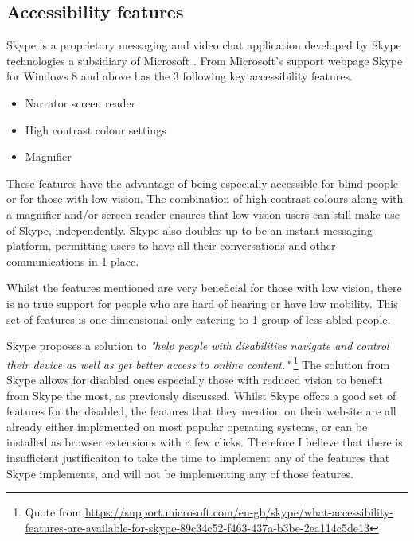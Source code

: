 \subsection*{Accessibility features}

Skype is a proprietary messaging and video chat application
developed by Skype technologies a subsidiary of Microsoft 
\cite{skype}. From Microsoft's support webpage Skype for 
Windows 8 and above has the 3 following key accessibility 
features.

\begin{itemize}
  \item Narrator screen reader
  \item High contrast colour settings
  \item Magnifier
\end{itemize}

These features have the advantage of being especially 
accessible for blind people or for those with low vision. The 
combination of high contrast colours along with a magnifier 
and/or screen reader ensures that low vision users can still 
make use of Skype, independently. Skype also doubles up to be
an instant messaging platform, permitting users to have all 
their conversations and other communications in 1 place.

\vspace{0.2cm}

Whilst the features mentioned are very beneficial for those 
with low vision, there is no true support for people who are
hard of hearing or have low mobility. This set of features is 
one-dimensional only catering to 1 group of less abled people.

\vspace{0.2cm}

Skype proposes a solution to \textit{"help people with 
disabilities navigate and control their device as well as get
better access to online content."} 
\footnote{Quote from \url{https://support.microsoft.com/en-gb/skype/what-accessibility-features-are-available-for-skype-89c34c52-f463-437a-b3be-2ea114c5de13}}
The solution from Skype allows for disabled ones especially 
those with reduced vision to benefit from Skype the most, as 
previously discussed. Whilst Skype offers a good set of
features for the disabled, the features that they mention on 
their website are all already either implemented on most 
popular operating systems, or can be installed as browser 
extensions with a few clicks. Therefore I believe that there is
insufficient justificaiton to take the time to implement any 
of the features that Skype implements, and will not be 
implementing any of those features.

